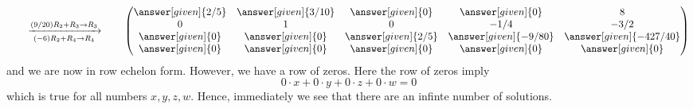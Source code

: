 \documentclass{ximera}
\begin{document}
\begin{example}
\begin{explanation}
\[  %
  \qquad\xrightarrow[(-6) R_2+R_4\to R_4]{(9/20) R_2 + R_3\to R_3}\qquad
  \begin{pmatrix}
    \answer[given]{2/5}&  \answer[given]{3/10} & \answer[given]{0} &\answer[given]{0} &8 \\
    {0}&  {1} & {0} &{-1/4} & -3/2\\
    \answer[given]{0}&  \answer[given]{0} & \answer[given]{2/5} &\answer[given]{-9/80} &\answer[given]{-427/40}\\
    \answer[given]{0}&  \answer[given]{0} & \answer[given]{0} &\answer[given]{0} &\answer[given]{0}
  \end{pmatrix}
\]
and we are now in row echelon form. However, we have a row of zeros.
Here the row of zeros imply
\[
0\cdot x+0\cdot y+0\cdot z+0\cdot w=0
\]
which is true for all numbers $x,y,z,w$. Hence, immediately we see
that there are an infinte number of solutions.


\end{explanation}
\end{example}
\end{document}
